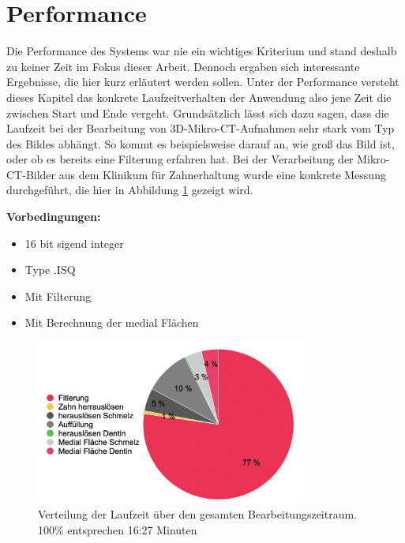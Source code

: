 \pagebreak

\section{Performance}
Die Performance des Systems war nie ein wichtiges Kriterium und stand deshalb zu
keiner Zeit im Fokus dieser Arbeit. Dennoch ergaben sich interessante Ergebnisse,
die hier kurz erläutert werden sollen. Unter der Performance versteht dieses Kapitel
das konkrete Laufzeitverhalten der Anwendung also jene Zeit die zwischen Start und
Ende vergeht. Grundsätzlich lässt sich dazu sagen, dass die Laufzeit bei der Bearbeitung
von \ac{3D}-Mikro-\ac{CT}-Aufnahmen sehr stark vom Typ des Bildes abhängt. So kommt es
beispielsweise darauf an, wie groß das Bild ist, oder ob es bereits eine Filterung
erfahren hat. Bei der Verarbeitung der Mikro-\ac{CT}-Bilder aus dem Klinikum für
Zahnerhaltung wurde eine konkrete Messung durchgeführt, die hier in Abbildung
\ref{fig:laufzeit} gezeigt wird.

\textbf{Vorbedingungen:}
\begin{itemize}
	\item 16 bit sigend integer

	\item Type .ISQ

	\item Mit Filterung

	\item Mit Berechnung der medial Flächen
\end{itemize}

\begin{figure}[h]
	\centering
	\includegraphics[width=0.8\textwidth]{img/laufzeit_diagramm.png}
	\caption{Verteilung der Laufzeit über den gesamten Bearbeitungszeitraum. 100\%
	entsprechen 16:27 Minuten}
	\label{fig:laufzeit}
\end{figure}

